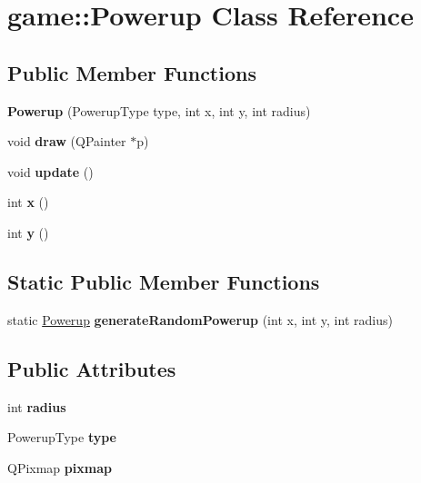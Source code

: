 \hypertarget{classgame_1_1Powerup}{}\section{game\+:\+:Powerup Class Reference}
\label{classgame_1_1Powerup}
\subsection*{Public Member Functions}
\begin{DoxyCompactItemize}
\item 
\mbox{\label{classgame_1_1Powerup_aa307799b1506bc5912c326d3a4b9aa6e}} 
{\bfseries Powerup} (Powerup\+Type type, int x, int y, int radius)
\item 
\mbox{\label{classgame_1_1Powerup_a57020b9b245c52bbae1e6f947b4fa8d0}} 
void {\bfseries draw} (Q\+Painter $\ast$p)
\item 
\mbox{\label{classgame_1_1Powerup_a6f53498b83a28f80d50ab4b588b6933a}} 
void {\bfseries update} ()
\item 
\mbox{\label{classgame_1_1Powerup_a27030babd43cd3e8701a9b8c44b02ecf}} 
int {\bfseries x} ()
\item 
\mbox{\label{classgame_1_1Powerup_ada6307d0b7f556d31eb7f7052dacd4f3}} 
int {\bfseries y} ()
\end{DoxyCompactItemize}
\subsection*{Static Public Member Functions}
\begin{DoxyCompactItemize}
\item 
\mbox{\label{classgame_1_1Powerup_afb95079f35c447eb5cc1a896dc307589}} 
static \hyperlink{classgame_1_1Powerup}{Powerup} {\bfseries generate\+Random\+Powerup} (int x, int y, int radius)
\end{DoxyCompactItemize}
\subsection*{Public Attributes}
\begin{DoxyCompactItemize}
\item 
\mbox{\label{classgame_1_1Powerup_ab412d4b3a4ca7d9943b93ae7c66fb9c9}} 
int {\bfseries radius}
\item 
\mbox{\label{classgame_1_1Powerup_a31242c7e6021b637ce6a764f6b1baa74}} 
Powerup\+Type {\bfseries type}
\item 
\mbox{\label{classgame_1_1Powerup_aa2c7842a03a4a3d1efa31cbf63a2d530}} 
Q\+Pixmap {\bfseries pixmap}
\end{DoxyCompactItemize}


